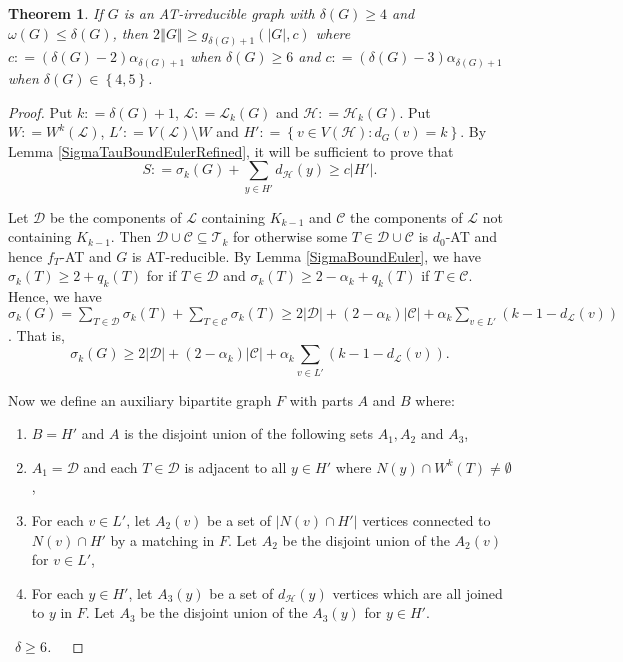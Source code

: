 \documentclass[12pt]{article}
\theoremstyle{plain}
\newtheorem{thm}{Theorem}[section]
\theoremstyle{definition}
\theoremstyle{remark}
\newcommand{\fancy}[1]{\mathcal{#1}}
\newcommand{\CC}{\fancy{C}}
\newcommand{\D}{\fancy{D}}
\newcommand{\T}{\fancy{T}}
\renewcommand{\L}{\fancy{L}}
\newcommand{\HH}{\fancy{H}}
\newcommand{\set}[1]{\left\{ #1 \right\}}
\newcommand{\setb}[3]{\left\{ #1 \in #2 : #3 \right\}}
\newcommand{\card}[1]{\left|#1\right|}
\newcommand{\size}[1]{\left\Vert#1\right\Vert}
\newcommand{\parens}[1]{\left( #1 \right)}
\newcommand{\DefinedAs}{\mathrel{\mathop:}=}
\def\D{\fancy{D}}
\newcommand{\case}[2]{{\bf Case #1.}~{\it #2}~~}
\begin{document}
\begin{thm}\label{EdgeBoundEuler}
	If $G$ is an AT-irreducible graph with $\delta(G) \ge 4$ and $\omega(G) \le \delta(G)$, then $2\size{G} \ge g_{\delta(G)+1}(\card{G}, c)$ where $c \DefinedAs (\delta(G)-2)\alpha_{\delta(G) + 1}$ when $\delta(G) \ge 6$ and $c \DefinedAs (\delta(G)-3)\alpha_{\delta(G) + 1}$ when $\delta(G) \in \set{4,5}$.
\end{thm}
\begin{proof}
Put $k \DefinedAs \delta(G) + 1$, $\L \DefinedAs \L_k(G)$ and $\HH \DefinedAs \HH_k(G)$.  Put $W \DefinedAs W^k(\L)$, $L' \DefinedAs V(\L) \setminus W$ and $H' \DefinedAs \setb{v}{V(\HH)}{d_G(v) = k}$.   By Lemma \ref{SigmaTauBoundEulerRefined}, it will be sufficient to prove that \[S \DefinedAs \sigma_k(G) + \sum_{y \in H'} d_{\HH}(y) \ge c\card{H'}.\]

Let $\D$ be the components of $\L$ containing $K_{k-1}$ and $\CC$ the components of $\L$ not containing $K_{k-1}$.  Then $\D \cup \CC \subseteq \T_k$ for otherwise some $T \in \D \cup \CC$ is $d_0$-AT and hence $f_T$-AT and $G$ is AT-reducible.  By Lemma \ref{SigmaBoundEuler}, we have $\sigma_k(T) \ge 2 + q_k(T)$ for if $T \in \D$ and $\sigma_k(T) \ge 2 - \alpha_k + q_k(T)$ if $T \in \CC$.  Hence, we have $\sigma_k(G) = \sum_{T \in \D} \sigma_k(T) + \sum_{T \in \CC} \sigma_k(T) \ge 2\card{\D} + (2-\alpha_k)\card{\CC} + \alpha_k\sum_{v \in L'} \parens{k-1 - d_{\L}(v)}$.  That is,
\[\sigma_k(G) \ge 2\card{\D} + (2-\alpha_k)\card{\CC} + \alpha_k\sum_{v \in L'} \parens{k-1 - d_{\L}(v)}.\]

Now we define an auxiliary bipartite graph $F$ with parts $A$ and $B$ where:
\begin{enumerate}
\item  $B = H'$ and $A$ is the disjoint union of the following sets
$A_1, A_2$ and $A_3$,
\item $A_1 = \D$ and each $T \in \D$ is adjacent to all $y \in H'$
where $N(y) \cap W^k(T) \ne \emptyset$,
\item For each $v \in L'$, let $A_2(v)$ be a set of $\card{N(v) \cap
H'}$ vertices connected to $N(v) \cap H'$ by a matching in $F$.  Let
$A_2$ be the disjoint union of the $A_2(v)$ for $v \in L'$,
\item For each $y \in H'$, let $A_3(y)$ be a set of $d_{\HH}(y)$ vertices
which are all joined to $y$ in $F$.  Let $A_3$ be the disjoint union
of the $A_3(y)$ for $y \in H'$.
\end{enumerate}

\noindent \case{1}{$\delta \ge 6$.}
\smallskip


\end{proof}
\end{document}
